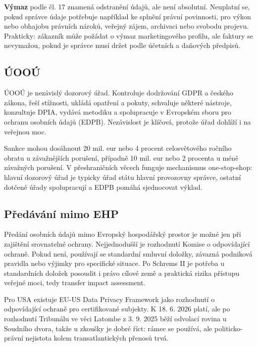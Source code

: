 \textbf{Výmaz} podle čl. 17 znamená odstranění údajů, ale není absolutní. Neuplatní se, pokud správce údaje potřebuje například ke splnění právní povinnosti, pro výkon nebo obhajobu právních nároků, veřejný zájem, archivaci nebo svobodu projevu. Prakticky: zákazník může požádat o výmaz marketingového profilu, ale faktury se nevymažou, pokud je správce musí držet podle účetních a daňových předpisů.

\subsection*{ÚOOÚ}
ÚOOÚ je nezávislý dozorový úřad. Kontroluje dodržování GDPR a českého zákona, řeší stížnosti, ukládá opatření a pokuty, schvaluje některé nástroje, konzultuje DPIA, vydává metodiku a spolupracuje v Evropském sboru pro ochranu osobních údajů (EDPB). Nezávislost je klíčová, protože úřad dohlíží i na veřejnou moc.

Sankce mohou dosáhnout 20 mil. eur nebo 4 procent celosvětového ročního obratu u závažnějších porušení, případně 10 mil. eur nebo 2 procenta u méně závažných porušení. V přeshraničních věcech funguje mechanismus one-stop-shop: hlavní dozorový úřad je typicky úřad státu hlavní provozovny správce, ostatní dotčené úřady spolupracují a EDPB pomáhá sjednocovat výklad.

\subsection*{Předávání mimo EHP}
Předání osobních údajů mimo Evropský hospodářský prostor je možné jen při zajištění srovnatelné ochrany. Nejjednodušší je rozhodnutí Komise o odpovídající ochraně. Pokud není, používají se standardní smluvní doložky, závazná podniková pravidla nebo výjimky pro specifické situace. Po Schrems II je potřeba u standardních doložek posoudit i právo cílové země a praktická rizika přístupu veřejné moci, tedy transfer impact assessment.

Pro USA existuje EU-US Data Privacy Framework jako rozhodnutí o odpovídající ochraně pro certifikované subjekty. K 18. 6. 2026 platí, ale po rozhodnutí Tribunálu ve věci Latombe z 3. 9. 2025 běží odvolací rovina u Soudního dvora, takže u zkoušky je dobré říct: rámec se používá, ale politicko-právní nejistota kolem transatlantických přenosů trvá.

